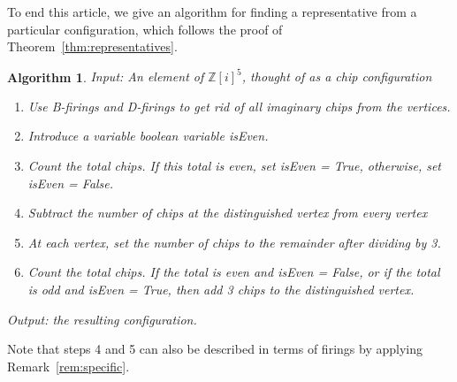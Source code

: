 \documentclass[12p]{amsart}
\numberwithin{equation}{section}
\theoremstyle{plain}
\newtheorem{alg}[thm]{Algorithm}
\theoremstyle{definition}
\newcommand{\Z}{\mathbb {Z}}
\begin{document}
To end this article, we give an algorithm for finding a representative from a particular configuration, which follows the proof of Theorem~\ref{thm:representatives}. 
\begin{alg}
    Input: An element of $\Z[i]^5$, thought of as a chip configuration
    \begin{enumerate}[1.]
        \item Use B-firings and D-firings to get rid of all imaginary chips from the vertices.
        \item Introduce a variable boolean variable isEven.
        \item Count the total chips. If this total is even, set isEven = True, otherwise, set isEven = False. 
        \item Subtract the number of chips at the distinguished vertex from every vertex
        \item At each vertex, set the number of chips to the remainder after dividing by 3. 
        \item Count the total chips. If the total is even and isEven = False, or if the total is odd and isEven = True, then add 3 chips to the distinguished vertex. 
    \end{enumerate}    
    Output: the resulting configuration.
\end{alg}

Note that steps 4 and 5 can also be described in terms of firings by applying Remark~\ref{rem:specific}. 



\end{document}
